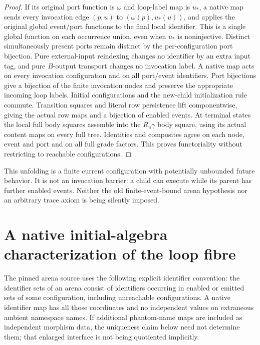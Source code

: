 \documentclass[11pt]{article}
\begin{document}
\begin{proof}
If its original port function is $\omega$ and loop-label map is $u_*$, a native map sends every invocation edge $(p,u)$ to $(\omega(p),u_*(u))$, and applies the original global event/port functions to the final local identifier. This is a single global function on each occurrence union, even when $u_*$ is noninjective. Distinct simultaneously present ports remain distinct by the per-configuration port bijection. Pure external-input reindexing changes no identifier by an extra input tag, and pure $B$-output transport changes no invocation label. A native map acts on every invocation configuration and on all port/event identifiers. Port bijections give a bijection of the finite invocation nodes and preserve the appropriate incoming loop labels. Initial configurations and the new-child initialization rule commute. Transition squares and literal row persistence lift componentwise, giving the actual row maps and a bijection of enabled events. At terminal states the local full body squares assemble into the $R_u\gamma$ body square, using its actual content maps on every full tree. Identities and composites agree on each node, event and port and on all full grade factors. This proves functoriality without restricting to reachable configurations.
\end{proof}

This unfolding is a finite current configuration with potentially unbounded future behavior. It is not an invocation barrier: a child can execute while its parent has further enabled events. Neither the old finite-event-bound arena hypothesis nor an arbitrary trace axiom is being silently imposed.

\section{A native initial-algebra characterization of the loop fibre}
The pinned arena source uses the following explicit identifier convention: the identifier sets of an arena consist of identifiers occurring in enabled or emitted sets of some configuration, including unreachable configurations. A native identifier map has all those coordinates and no independent values on extraneous ambient namespace names. If additional phantom-name maps are included as independent morphism data, the uniqueness claim below need not determine them; that enlarged interface is not being quotiented implicitly.
\end{document}

